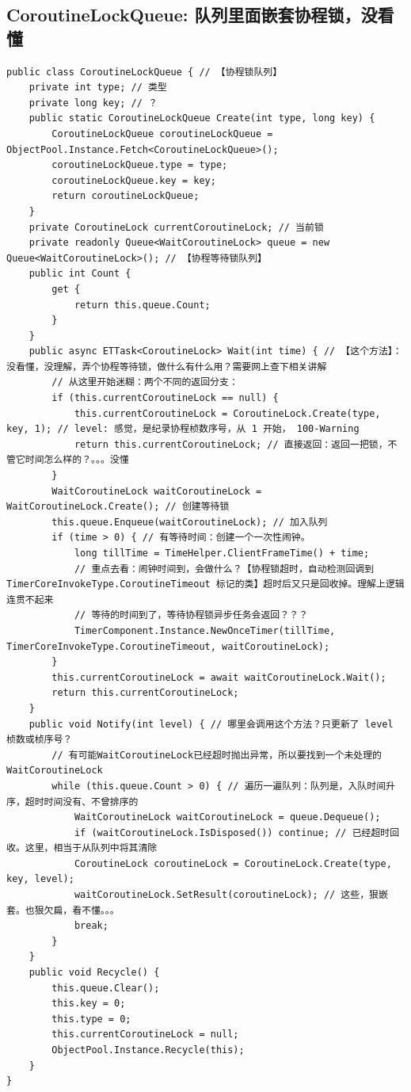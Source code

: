 \documentclass[9pt, b5paper]{article}
\begin{document}
\subsection{CoroutineLockQueue: 队列里面嵌套协程锁，没看懂}
\label{sec-14-3}
\begin{verbatim}
public class CoroutineLockQueue { // 【协程锁队列】
    private int type; // 类型
    private long key; // ？
    public static CoroutineLockQueue Create(int type, long key) {
        CoroutineLockQueue coroutineLockQueue = ObjectPool.Instance.Fetch<CoroutineLockQueue>();
        coroutineLockQueue.type = type;
        coroutineLockQueue.key = key;
        return coroutineLockQueue;
    }
    private CoroutineLock currentCoroutineLock; // 当前锁
    private readonly Queue<WaitCoroutineLock> queue = new Queue<WaitCoroutineLock>(); // 【协程等待锁队列】
    public int Count {
        get {
            return this.queue.Count;
        }
    }
    public async ETTask<CoroutineLock> Wait(int time) { // 【这个方法】：没看懂，没理解，弄个协程等待锁，做什么有什么用？需要网上查下相关讲解
        // 从这里开始迷糊：两个不同的返回分支：
        if (this.currentCoroutineLock == null) {
            this.currentCoroutineLock = CoroutineLock.Create(type, key, 1); // level: 感觉，是纪录协程桢数序号，从 1 开始， 100-Warning
            return this.currentCoroutineLock; // 直接返回：返回一把锁，不管它时间怎么样的？。。。没懂
        }
        WaitCoroutineLock waitCoroutineLock = WaitCoroutineLock.Create(); // 创建等待锁
        this.queue.Enqueue(waitCoroutineLock); // 加入队列
        if (time > 0) { // 有等待时间：创建一个一次性闹钟。
            long tillTime = TimeHelper.ClientFrameTime() + time;
            // 重点去看：闹钟时间到，会做什么？【协程锁超时，自动检测回调到TimerCoreInvokeType.CoroutineTimeout 标记的类】超时后又只是回收掉。理解上逻辑连贯不起来
            // 等待的时间到了，等待协程锁异步任务会返回？？？
            TimerComponent.Instance.NewOnceTimer(tillTime, TimerCoreInvokeType.CoroutineTimeout, waitCoroutineLock);
        }
        this.currentCoroutineLock = await waitCoroutineLock.Wait();
        return this.currentCoroutineLock;
    }
    public void Notify(int level) { // 哪里会调用这个方法？只更新了 level 桢数或桢序号？
        // 有可能WaitCoroutineLock已经超时抛出异常，所以要找到一个未处理的WaitCoroutineLock
        while (this.queue.Count > 0) { // 遍历一遍队列：队列是，入队时间升序，超时时间没有、不曾排序的
            WaitCoroutineLock waitCoroutineLock = queue.Dequeue();
            if (waitCoroutineLock.IsDisposed()) continue; // 已经超时回收。这里，相当于从队列中将其清除
            CoroutineLock coroutineLock = CoroutineLock.Create(type, key, level);
            waitCoroutineLock.SetResult(coroutineLock); // 这些，狠嵌套。也狠欠扁，看不懂。。。
            break;
        }
    }
    public void Recycle() {
        this.queue.Clear();
        this.key = 0;
        this.type = 0;
        this.currentCoroutineLock = null;
        ObjectPool.Instance.Recycle(this);
    }
}
\end{verbatim}
\end{document}
